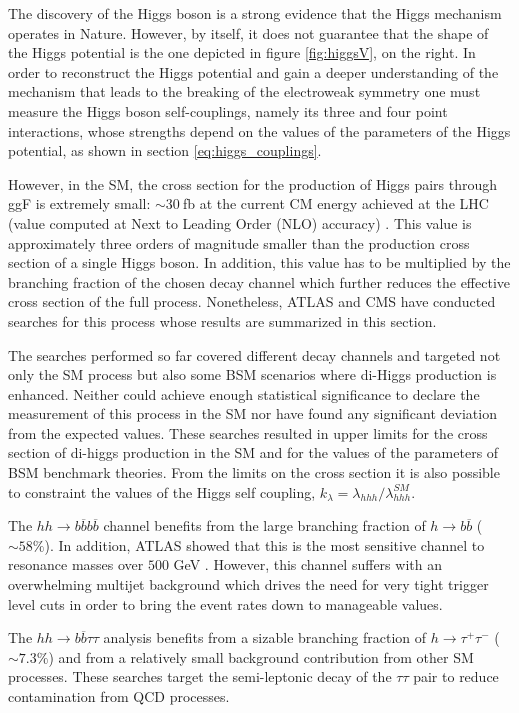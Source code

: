 The discovery of the Higgs boson is a strong evidence that the Higgs mechanism operates in Nature. However, by itself, it does not guarantee that the shape of the Higgs potential is the one depicted in figure \ref{fig:higgsV}, on the right. In order to reconstruct the Higgs potential and gain a deeper understanding of the mechanism that leads to the breaking of the electroweak symmetry one must measure the Higgs boson self-couplings, namely its three and four point interactions, whose strengths depend on the values of the parameters of the Higgs potential, as shown in section \ref{eq:higgs_couplings}.  

However, in the SM, the cross section for the production of Higgs pairs through ggF is extremely small: $\sim30~$fb at the current CM energy achieved at the LHC (value computed at Next to Leading Order (NLO) accuracy) \cite{higgsCrossSection}. This value is approximately three orders of magnitude smaller than the production cross section of a single Higgs boson. In addition, this value has to be multiplied by the branching fraction of the chosen decay channel which further reduces the effective cross section of the full process. Nonetheless, ATLAS and CMS have conducted searches for this process whose results are summarized in this section.

The searches performed so far covered different decay channels and targeted not only the SM process but also some BSM scenarios where di-Higgs production is enhanced. Neither could achieve enough statistical significance to declare the measurement of this process in the SM nor have found any significant deviation from the expected values. These searches resulted in upper limits for the cross section of di-higgs production in the SM and for the values of the parameters of BSM benchmark theories. From the limits on the cross section it is also possible to constraint the values of the Higgs self coupling, $k_{\lambda}=\lambda_{hhh}/\lambda_{hhh}^{SM}$.

The $hh\rightarrow b\overline{b}b\overline{b}$ channel \cite{hh2bbbbATLAS,hh2bbbbCMS} benefits from the large branching fraction of $h\rightarrow b\overline{b}$ ($\sim 58 \%$). In addition, ATLAS showed that this is the most sensitive channel to resonance masses over $500$ GeV \cite{hhATLAS}. However, this channel suffers with an overwhelming multijet background which drives the need for very tight trigger level cuts in order to bring the event rates down to manageable values.

The $hh\rightarrow b\overline{b}\tau\tau$ analysis \cite{hhbbtautau_CMS,hhATLAS} benefits from a sizable branching fraction of $h\rightarrow\tau^+\tau^-$ ($\sim 7.3\%$) and from a relatively small background contribution from other SM processes. These searches target the semi-leptonic decay of the $\tau\tau$ pair to reduce contamination from QCD processes.

